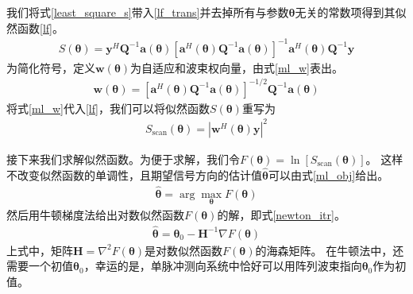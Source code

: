 \documentclass[master]{thesis-uestc}
\begin{document}
我们将式\eqref{least_square_s}带入\eqref{lf_trans}并去掉所有与参数$\bm{\theta}$无关的常数项得到其似然函数\eqref{lf}。
\begin{equation}\label{lf}
    \begin{aligned}
        S(\bm{\theta})=\bm{y}^{H} \bm{Q}^{-1} \bm{a}(\bm{\theta})
        \left[\bm{a}^{H}(\bm{\theta}) \bm{Q}^{-1} \bm{a}(\bm{\theta})\right]^{-1} 
        \bm{a}^{H}(\bm{\theta}) \bm{Q}^{-1} \bm{y}
    \end{aligned}
\end{equation}
为简化符号，定义$\bm{w}(\bm{\theta})$为自适应和波束权向量，由式\eqref{ml_w}表出。
\begin{equation}\label{ml_w}
    \begin{aligned}
        \bm{w}(\bm{\theta})=
        \left[\bm{a}^{H}(\bm{\theta}) \bm{Q}^{-1} \bm{a}(\bm{\theta})\right]^{-1 / 2} 
        \bm{Q}^{-1} \bm{a}(\bm{\theta})
    \end{aligned}
\end{equation}
将式\eqref{ml_w}代入\eqref{lf}，我们可以将似然函数$S(\bm{\theta})$重写为
\begin{equation}
    \begin{aligned}
        S_{\mathrm{scan}}(\bm{\theta})=\left|\bm{w}^{H}(\bm{\theta}) \bm{y}\right|^{2}
    \end{aligned}
\end{equation}

接下来我们求解似然函数。为便于求解，我们令$F(\bm{\theta})=\ln \left[S_{\mathrm{scan}}(\bm{\theta})\right]$。
这样不改变似然函数的单调性，且期望信号方向的估计值$\hat{\bm{\theta}}$可以由式\eqref{ml_obj}给出。
\begin{equation}\label{ml_obj}
    \begin{aligned}
        \hat{\bm{\theta}}=\arg\max_{\bm{\theta}} F(\bm{\theta})
    \end{aligned}
\end{equation}
然后用牛顿梯度法给出对数似然函数$F(\bm{\theta})$的解，即式\eqref{newton_itr}。
\begin{equation}\label{newton_itr}
    \begin{aligned}
        \hat{\bm{\theta}}=\bm{\theta}_0-\bm{H}^{-1} \nabla F(\bm{\theta})
    \end{aligned}
\end{equation}
上式中，矩阵$\bm{H}=\nabla^2F(\bm{\theta})$是对数似然函数$F(\bm{\theta})$的海森矩阵。
在牛顿法中，还需要一个初值$\bm{\theta}_0$，幸运的是，单脉冲测向系统中恰好可以用阵列波束指向$\bm{\theta}_0$作为初值。
\end{document}
